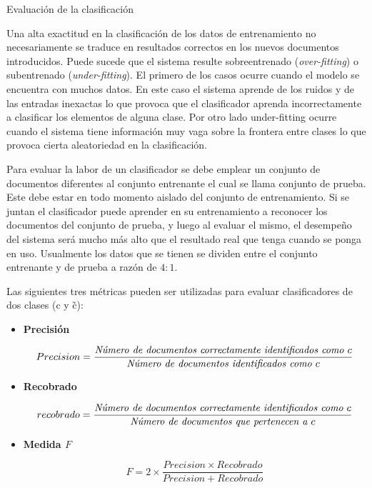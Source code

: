 \documentclass{llncs}
\begin{document}
		
		\begin{subsection}{Evaluaci\'on de la clasificaci\'on}
			
			Una alta exactitud en la clasificaci\'on de los datos de entrenamiento no necesariamente se traduce en resultados correctos en los nuevos documentos introducidos. Puede sucede que el sistema resulte sobreentrenado (\emph{over-fitting}) o subentrenado (\emph{under-fitting}). El primero de los casos ocurre cuando el modelo se encuentra con muchos datos. En este caso el sistema aprende de los ruidos y de las entradas inexactas lo que provoca que el clasificador aprenda incorrectamente a clasificar los elementos de alguna clase. Por otro lado under-fitting ocurre cuando el sistema tiene informaci\'on muy vaga sobre la frontera entre clases lo que provoca cierta aleatoriedad en la clasificaci\'on.
			
			Para evaluar la labor de un clasificador se debe emplear un conjunto de documentos diferentes al conjunto entrenante el cual se llama conjunto de prueba. Este debe estar en todo momento aislado del conjunto de entrenamiento. Si se juntan el clasificador puede aprender en su entrenamiento a reconocer los documentos del conjunto de prueba, y luego  al evaluar el mismo, el desempe\~no del sistema ser\'a mucho m\'as alto que el resultado real que tenga cuando se ponga en uso. Usualmente los datos que se tienen se dividen entre el conjunto entrenante y de prueba a raz\'on de $4:1$.
			
			Las siguientes tres m\'etricas pueden ser utilizadas para evaluar clasificadores de dos clases (c y \~c):	
					
			\begin{itemize}
				
				\item\textbf{Precisi\'on}
				
				\[
				Precision = \frac{\emph{N\'umero de documentos correctamente identificados como $c$} }{\emph{N\'umero de documentos identificados como $c$}}
				\]
				
				\item\textbf{Recobrado}
				
				\[
				recobrado = \frac{\emph{N\'umero de documentos correctamente identificados como $c$} }{\emph{N\'umero de documentos que pertenecen a $c$}}
				\]
				
				\item\textbf{Medida $F$} 
				
				\[
					F = 2 \times  \frac{Precision \times Recobrado}{Precision + Recobrado}
				\]
				

\end{itemize}
\end{subsection}
\end{document}
